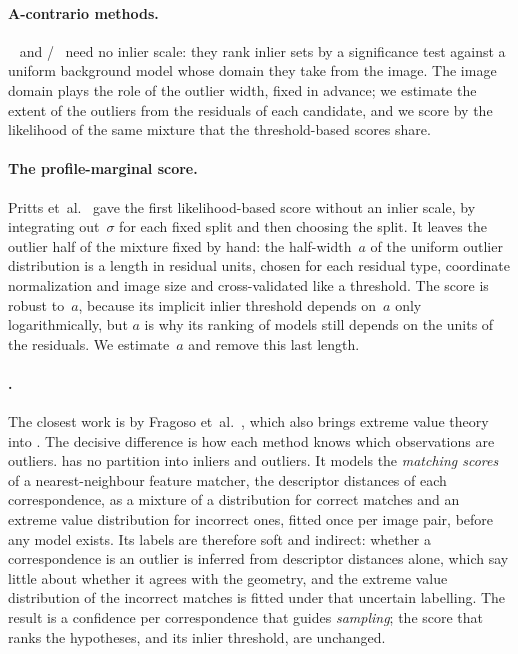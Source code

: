 \paragraph{A-contrario methods.}
\minpran~\cite{Stewart1995} and \orsa/\acransac~\cite{Moisan2004,Moisan2012}
need no inlier scale: they rank inlier sets by a significance test against a
uniform background model whose domain they take from the image.  The image
domain plays the role of the outlier width, fixed in advance; we estimate
the extent of the outliers from the residuals of each candidate, and we
score by the likelihood of the same \gaussunif mixture that the
threshold-based scores share.

\paragraph{The profile-marginal score.}
Pritts et~al.~\cite{Pritts2026} gave the first likelihood-based score
without an inlier scale, by integrating out~$\sigma$ for each fixed split
and then choosing the split.  It leaves the outlier half of the mixture
fixed by hand: the half-width~$a$ of the uniform outlier distribution is a
length in residual units, chosen for each residual type, coordinate
normalization and image size and cross-validated like a threshold.  The
score is robust to~$a$, because its implicit inlier threshold depends on~$a$
only logarithmically, but $a$ is why its ranking of models still depends on
the units of the residuals.  We estimate~$a$ and remove this last length.

\paragraph{\evsac.}
The closest work is \evsac by Fragoso et~al.~\cite{Fragoso2013evsac}, which
also brings extreme value theory into \ransac.  The decisive difference is
how each method knows which observations are outliers.  \evsac has no
partition into inliers and outliers.  It models the \emph{matching scores}
of a nearest-neighbour feature matcher, the descriptor distances of each
correspondence, as a mixture of a distribution for correct matches and an
extreme value distribution for incorrect ones, fitted once per image pair,
before any model exists.  Its labels are therefore soft and indirect:
whether a correspondence is an outlier is inferred from descriptor
distances alone, which say little about whether it agrees with the
geometry, and the extreme value distribution of the incorrect matches is
fitted under that uncertain labelling.  The result is a confidence per
correspondence that guides \emph{sampling}; the score that ranks the
hypotheses, and its inlier threshold, are unchanged.

